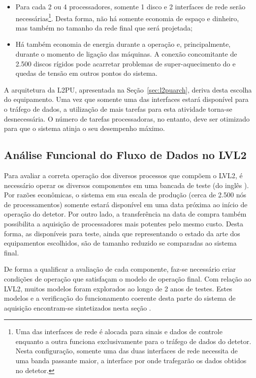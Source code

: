 \begin{itemize}
\item Para cada 2 ou 4 processadores, somente 1 disco e 2 interfaces de rede
serão necessárias\footnote{Uma das interfaces de rede é alocada para sinais e
dados de controle enquanto a outra funciona exclusivamente para o tráfego de
dados do detetor. Nesta configuração, somente uma das duas interfaces de rede
necessita de uma banda passante maior, a interface por onde trafegarão os
dados obtidos no detetor.}. Desta forma, não há somente economia de espaço e
dinheiro, mas também no tamanho da rede final que será projetada;

\item Há também economia de energia durante a operação e, principalmente,
durante o momento de ligação das máquinas. A conexão concomitante de 2.500
discos rígidos pode acarretar problemas de super-aquecimento do 
e quedas de tensão em outros pontos do sistema.
\end{itemize}

A arquitetura da L2PU, apresentada na Seção~\ref{sec:l2puarch}, deriva desta
escolha do equipamento. Uma vez que somente uma das interfaces estará
disponível para o tráfego de dados, a utilização de mais tarefas para esta
atividade torna-se desnecessária. O número de tarefas processadoras, no
entanto, deve ser otimizado para que o sistema atinja o seu desempenho máximo.

\subsection{Análise Funcional do Fluxo de Dados no LVL2}
\label{sec:lvl2work}

Para avaliar a correta operação dos diversos processos que compõem o LVL2, é
necessário operar os diversos componentes em uma bancada de teste (do inglês
). Por razões econômicas, o sistema em sua escala de produção
(cerca de 2.500 nós de processamentos) somente estará disponível em uma data
próxima ao início de operação do detetor. Por outro lado, a transferência na
data de compra também possibilita a aquisição de processadores mais potentes
pelo mesmo custo. Desta forma, as  disponíveis para teste, ainda
que representando o estado da arte dos equipamentos escolhidos, são de tamanho
reduzido se comparadas ao sistema final.

De forma a qualificar a avaliação de cada componente, faz-se necessário criar
condições de operação que satisfaçam o modelo de operação final. Com relação
ao LVL2, muitos modelos foram explorados \cite{aa:tns-2004} ao longo de 2 anos
de testes. Estes modelos e a verificação do funcionamento coerente desta parte
do sistema de aquisição encontram-se sintetizados nesta seção \cite{hlt-tdr}.

